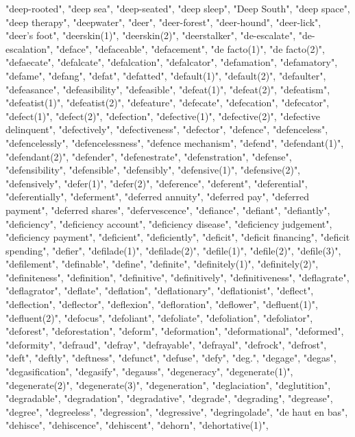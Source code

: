 "deep-rooted",
"deep sea",
"deep-seated",
"deep sleep",
"Deep South",
"deep space",
"deep therapy",
"deepwater",
"deer",
"deer-forest",
"deer-hound",
"deer-lick",
"deer's foot",
"deerskin(1)",
"deerskin(2)",
"deerstalker",
"de-escalate",
"de-escalation",
"deface",
"defaceable",
"defacement",
"de facto(1)",
"de facto(2)",
"defaecate",
"defalcate",
"defalcation",
"defalcator",
"defamation",
"defamatory",
"defame",
"defang",
"defat",
"defatted",
"default(1)",
"default(2)",
"defaulter",
"defeasance",
"defeasibility",
"defeasible",
"defeat(1)",
"defeat(2)",
"defeatism",
"defeatist(1)",
"defeatist(2)",
"defeature",
"defecate",
"defecation",
"defecator",
"defect(1)",
"defect(2)",
"defection",
"defective(1)",
"defective(2)",
"defective delinquent",
"defectively",
"defectiveness",
"defector",
"defence",
"defenceless",
"defencelessly",
"defencelessness",
"defence mechanism",
"defend",
"defendant(1)",
"defendant(2)",
"defender",
"defenestrate",
"defenstration",
"defense",
"defensibility",
"defensible",
"defensibly",
"defensive(1)",
"defensive(2)",
"defensively",
"defer(1)",
"defer(2)",
"deference",
"deferent",
"deferential",
"deferentially",
"deferment",
"deferred annuity",
"deferred pay",
"deferred payment",
"deferred shares",
"defervescence",
"defiance",
"defiant",
"defiantly",
"deficiency",
"deficiency account",
"deficiency disease",
"deficiency judgement",
"deficiency payment",
"deficient",
"deficiently",
"deficit",
"deficit financing",
"deficit spending",
"defier",
"defilade(1)",
"defilade(2)",
"defile(1)",
"defile(2)",
"defile(3)",
"defilement",
"definable",
"define",
"definite",
"definitely(1)",
"definitely(2)",
"definiteness",
"definition",
"definitive",
"definitively",
"definitiveness",
"deflagrate",
"deflagrator",
"deflate",
"deflation",
"deflationary",
"deflationist",
"deflect",
"deflection",
"deflector",
"deflexion",
"defloration",
"deflower",
"defluent(1)",
"defluent(2)",
"defocus",
"defoliant",
"defoliate",
"defoliation",
"defoliator",
"deforest",
"deforestation",
"deform",
"deformation",
"deformational",
"deformed",
"deformity",
"defraud",
"defray",
"defrayable",
"defrayal",
"defrock",
"defrost",
"deft",
"deftly",
"deftness",
"defunct",
"defuse",
"defy",
"deg.",
"degage",
"degas",
"degasification",
"degasify",
"degauss",
"degeneracy",
"degenerate(1)",
"degenerate(2)",
"degenerate(3)",
"degeneration",
"deglaciation",
"deglutition",
"degradable",
"degradation",
"degradative",
"degrade",
"degrading",
"degrease",
"degree",
"degreeless",
"degression",
"degressive",
"degringolade",
"de haut en bas",
"dehisce",
"dehiscence",
"dehiscent",
"dehorn",
"dehortative(1)",

